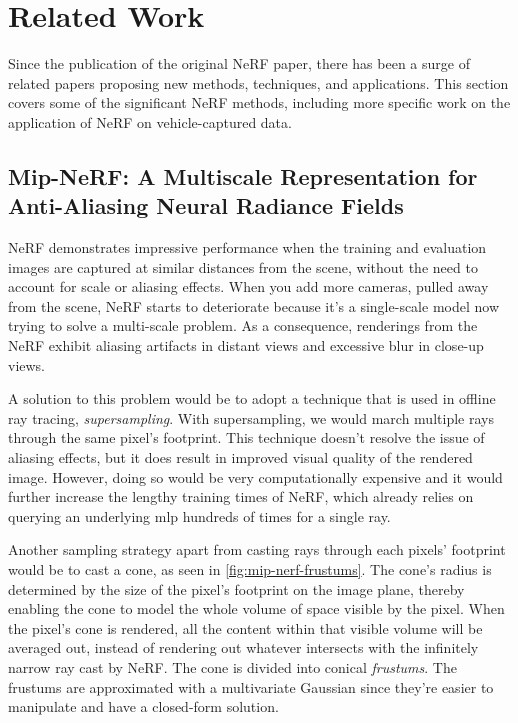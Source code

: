 



\section{Related Work}
Since the publication of the original NeRF paper, there has been a surge of related papers proposing new methods, techniques, and applications. This section covers some of the significant NeRF methods, including more specific work on the application of NeRF on vehicle-captured data.

\subsection[Mip-NeRF]{Mip-NeRF: A Multiscale Representation for Anti-Aliasing Neural Radiance Fields} \label{sec:mipnerf}
NeRF demonstrates impressive performance when the training and evaluation images are captured at similar distances from the scene, without the need to account for scale or aliasing effects. When you add more cameras, pulled away from the scene, NeRF starts to deteriorate because it's a single-scale model now trying to solve a multi-scale problem. As a consequence, renderings from the NeRF exhibit aliasing artifacts in distant views and excessive blur in close-up views.

A solution to this problem would be to adopt a technique that is used in offline ray tracing, \textit{supersampling}. With supersampling, we would march multiple rays through the same pixel's footprint. This technique doesn't resolve the issue of aliasing effects, but it does result in improved visual quality of the rendered image. However, doing so would be very computationally expensive and it would further increase the lengthy training times of NeRF, which already relies on querying an underlying \acrshort{mlp} hundreds of times for a single ray.

Another sampling strategy apart from casting rays through each pixels' footprint would be to cast a cone, as seen in \autoref{fig:mip-nerf-frustums}. The cone's radius is determined by the size of the pixel's footprint on the image plane, thereby enabling the cone to model the whole volume of space visible by the pixel. When the pixel's cone is rendered, all the content within that visible volume will be averaged out, instead of rendering out whatever intersects with the infinitely narrow ray cast by NeRF. The cone is divided into conical \textit{frustums}. The frustums are approximated with a multivariate Gaussian since they're easier to manipulate and have a closed-form solution.

